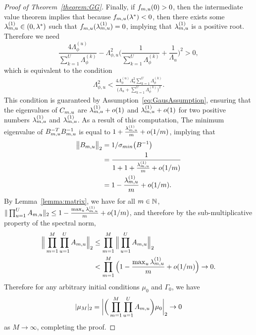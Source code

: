 \begin{proof}[Proof of Theorem~\ref{theorem:GG}]
Finally, if $f_{m, u}(0) > 0$, then the intermediate value theorem implies that because $f_{m, u}(\lambda^*) < 0$, then there exists some $\lambda^{(1)}_{m, u} \in (0, \lambda^{*})$ such that $f_{m, u}(\lambda^{(1)}_{m, u}) = 0$, implying that $\lambda^{(1)}_{m, u}$ is a positive root.
Therefore we need 
$$
\frac{4\Lambda^{(u)}_{\phi}}{\sum_{k = 1}^U\Lambda^{(k)}_{\phi}} - \Lambda_{\phi, u}^2\bigg(\frac{1}{\sum_{k = 1}^U\Lambda^{(k)}_{\phi}} + \frac{1}{\Lambda_u}\bigg)^2 > 0,
$$
which is equivalent to the condition
\begin{align*}
  \Lambda_{\phi, u}^2 < \frac{4\Lambda^{(u)}_\phi\Lambda^2_{u}\sum_{k = 1}^U \Lambda_{\phi}^{(k)}}{\big(\Lambda_u + \sum_{k = 1}^{U}\Lambda^{(k)}_{\phi}\big)^2}.
\end{align*}
This condition is guaranteed by Assumption~\ref{eq:GausAssumption}, ensuring that the eigenvalues of $C_{m, u}$ are $\lambda^{(1)}_{m, u} + o(1)$ and $\lambda^{(1)}_{m, u} + o(1)$ for two positive numbers $\lambda^{(1)}_{m, u}$ and $\lambda^{(1)}_{m, u}$.
As a result of this computation, The minimum eigenvalue of $B^{-T}_{m, u}B^{-1}_{m, u}$ is equal to $1 + \frac{\lambda^{(1)}_{m, u}}{m} + o(1/m)$, implying that 
\begin{align*}
  \big\| B_{m, u}\big\|_2 &= 1 / \sigma_{min}\big(B^{-1} \big) \\
  &= \frac{1}{1 + 1 + \frac{\lambda^{(1)}_{m, u}}{m} + o(1/m)} \\
  &= 1 - \frac{\lambda^{(1)}_{m, u}}{m} + o(1/m). 
\end{align*}
By Lemma~\ref{lemma:matrix}, we have for all $m \in \mathbb{N}$, $\|\prod_{u = 1}^U A_{m, u}\|_2 \leq 1 - \frac{\max_u \lambda^{(1)}_{m, u}}{m} + o(1/m)$, and therefore by the sub-multiplicative property of the spectral norm,
\begin{align*}
  \Big\| \prod_{m = 1}^M \prod_{u = 1}^U A_{m, u}\Big\|_2 & \leq \prod_{m = 1}^M \Big\|\prod_{u = 1}^U A_{m, u}\Big\|_2 \\
  &< \prod_{m = 1}^M \Big(1 - \frac{\max_u \lambda^{(1)}_{m, u}}{m} + o(1/m)\Big) \rightarrow 0.
\end{align*}
Therefore for any arbitrary initial conditions $\mu_0$ and $\Gamma_0$, we have
$$\vert\mu_M\vert_2 = \bigg\vert\bigg(\prod_{m = 1}^M\prod_{u = 1}^U A_{m, u}\bigg)\mu_0\bigg\vert_2 \rightarrow 0$$
as $M\rightarrow \infty$, completing the proof.

\end{proof}

